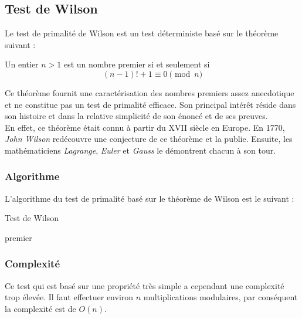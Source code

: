 \subsection{Test de Wilson}
	Le test de primalité de Wilson est un test déterministe basé sur le théorème suivant :
		
		\vspace{-1.5em}\begin{adjustwidth}{1.5cm}{1.5cm} 
		\begin{Th}
			Un entier $n > 1$ est un nombre premier si et seulement si
			\[(n-1)! + 1 \equiv 0 \pmod n\]
		\end{Th}
		\end{adjustwidth}\vspace{0.5em}
		
	Ce théorème fournit une caractérisation des nombres premiers assez anecdotique et ne constitue pas un test de primalité efficace. Son principal intérêt réside dans son histoire et dans la relative simplicité de son énoncé et de ses preuves.\\
	En effet, ce théorème était connu à partir du XVII siècle en Europe. En 1770, \textit{John Wilson} redécouvre une conjecture de ce théorème et la publie. Ensuite, les mathématiciens \textit{Lagrange}, \textit{Euler} et \textit{Gauss} le démontrent chacun à son tour. 
		
	\subsubsection*{Algorithme}
		L'algorithme du test de primalité basé sur le théorème de Wilson est le suivant :\\
		
		\begin{algorithm}[H]
			\caption{Test de Wilson}\label{Wil}
			 { 
				{\Retour premier\;}
			} 
		\end{algorithm}	
		
	\subsubsection*{Complexité}
		Ce test qui est basé sur une propriété très simple a cependant une complexité trop élevée. Il faut effectuer environ $n$ multiplications modulaires, par conséquent la complexité est de $O(n)$.

